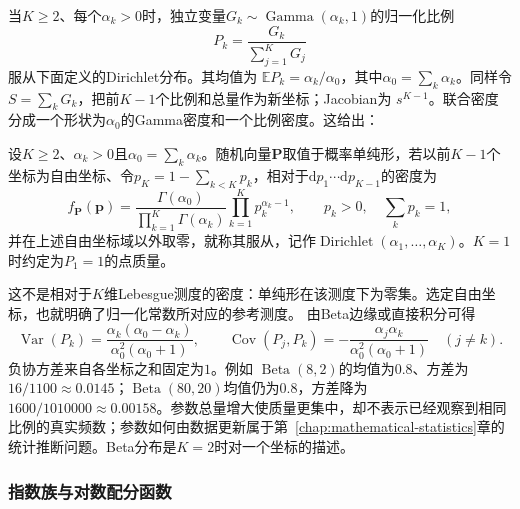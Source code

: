 当\(K\geq2\)、每个\(\alpha_k>0\)时，独立变量\(G_k\sim\operatorname{Gamma}(\alpha_k,1)\)的归一化比例
\[ P_k=\frac{G_k}{\sum_{j=1}^{K}G_j} \]
服从下面定义的Dirichlet分布。其均值为
\(\mathbb{E}P_k=\alpha_k/\alpha_0\)，其中\(\alpha_0=\sum_k\alpha_k\)。同样令
\(S=\sum_kG_k\)，把前\(K-1\)个比例和总量作为新坐标；Jacobian为
\(s^{K-1}\)。联合密度分成一个形状为\(\alpha_0\)的Gamma密度和一个比例密度。这给出：
\begin{definition}[Dirichlet分布]
  \label{def:probability-dirichlet-distribution}
设\(K\geq2\)、\(\alpha_k>0\)且\(\alpha_0=\sum_k\alpha_k\)。随机向量\(\bm P\)取值于概率单纯形，若以前\(K-1\)个坐标为自由坐标、令\(p_K=1-\sum_{k<K}p_k\)，相对于\(\mathrm dp_1\cdots\mathrm dp_{K-1}\)的密度为
\[
  f_{\bm{P}}(\bm{p})
  =
  \frac{\Gamma(\alpha_0)}
       {\prod_{k=1}^{K}\Gamma(\alpha_k)}
  \prod_{k=1}^{K}p_k^{\alpha_k-1},
  \qquad p_k>0,\quad\sum_kp_k=1,
\]
并在上述自由坐标域以外取零，就称其服从，记作\(\operatorname{Dirichlet}(\alpha_1,\ldots,\alpha_K)\)。\(K=1\)时约定为\(P_1=1\)的点质量。
\end{definition}
这不是相对于\(K\)维Lebesgue测度的密度：单纯形在该测度下为零集。选定自由坐标，也就明确了归一化常数所对应的参考测度。
由Beta边缘或直接积分可得
\[
  \operatorname{Var}(P_k)
  =\frac{\alpha_k(\alpha_0-\alpha_k)}
        {\alpha_0^2(\alpha_0+1)},\qquad
  \operatorname{Cov}(P_j,P_k)
  =-\frac{\alpha_j\alpha_k}
         {\alpha_0^2(\alpha_0+1)}
  \quad(j\neq k).
\]
负协方差来自各坐标之和固定为\(1\)。例如
\(\operatorname{Beta}(8,2)\)的均值为\(0.8\)、方差为
\(16/1100\approx0.0145\)；\(\operatorname{Beta}(80,20)\)均值仍为\(0.8\)，方差降为
\(1600/1010000\approx0.00158\)。参数总量增大使质量更集中，却不表示已经观察到相同比例的真实频数；参数如何由数据更新属于第~\ref{chap:mathematical-statistics}章的统计推断问题。Beta分布是\(K=2\)时对一个坐标的描述。

\subsubsection{指数族与对数配分函数}

